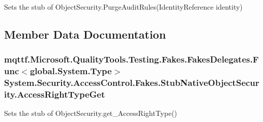 Sets the stub of Object\-Security.\-Purge\-Audit\-Rules(\-Identity\-Reference identity)



\subsection{Member Data Documentation}
\hypertarget{class_system_1_1_security_1_1_access_control_1_1_fakes_1_1_stub_native_object_security_ad4787566899754ccef6878207e5049cd}{
\subsubsection[{Access\-Right\-Type\-Get}]{\setlength{\rightskip}{0pt plus 5cm}mqttf.\-Microsoft.\-Quality\-Tools.\-Testing.\-Fakes.\-Fakes\-Delegates.\-Func$<$global.\-System.\-Type$>$ System.\-Security.\-Access\-Control.\-Fakes.\-Stub\-Native\-Object\-Security.\-Access\-Right\-Type\-Get}}\label{class_system_1_1_security_1_1_access_control_1_1_fakes_1_1_stub_native_object_security_ad4787566899754ccef6878207e5049cd}


Sets the stub of Object\-Security.\-get\-\_\-\-Access\-Right\-Type()


